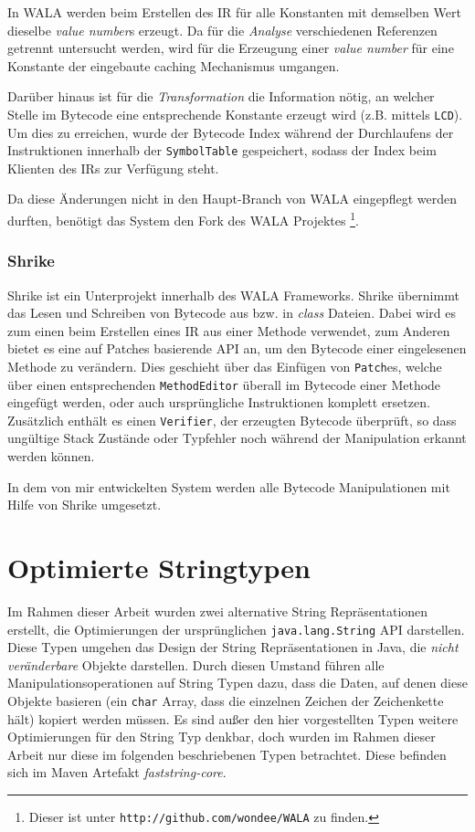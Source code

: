 In WALA werden beim Erstellen des IR für alle Konstanten mit demselben Wert dieselbe \textit{value number}s erzeugt. 
Da für die \textit{Analyse} verschiedenen Referenzen getrennt untersucht werden, wird 
für die Erzeugung einer \textit{value number} für eine Konstante der eingebaute caching Mechanismus umgangen. 

Darüber hinaus ist für die \textit{Transformation} die Information nötig, an welcher Stelle im Bytecode eine
entsprechende Konstante erzeugt wird (z.B. mittels \texttt{LCD}). Um dies zu erreichen, wurde der Bytecode 
Index während der Durchlaufens der Instruktionen innerhalb der \texttt{SymbolTable} gespeichert, 
sodass der Index beim Klienten des IRs zur Verfügung steht.

Da diese Änderungen nicht in den Haupt-Branch von WALA eingepflegt werden durften, benötigt das System den 
Fork des WALA Projektes \footnote{Dieser ist unter \texttt{http://github.com/wondee/WALA} zu finden.}.


\subsection{Shrike}

Shrike ist ein Unterprojekt innerhalb des WALA Frameworks. Shrike übernimmt das Lesen und  
Schreiben von Bytecode aus bzw. in \textit{class} Dateien. Dabei wird es zum einen beim 
Erstellen eines IR aus einer Methode verwendet, zum Anderen bietet es eine auf Patches 
basierende API an, um den Bytecode einer eingelesenen Methode zu verändern. Dies geschieht 
über das Einfügen von \texttt{Patch}es, welche über einen 
entsprechenden \texttt{MethodEditor} überall im Bytecode einer Methode eingefügt werden, oder auch 
ursprüngliche Instruktionen komplett ersetzen. Zusätzlich enthält es einen \texttt{Verifier}, der erzeugten 
Bytecode überprüft, so dass ungültige Stack Zustände oder Typfehler noch während der Manipulation erkannt 
werden können. 

In dem von mir entwickelten System werden alle Bytecode Manipulationen mit Hilfe von Shrike umgesetzt. 

\chapter{Optimierte Stringtypen}\label{stringLabels}

Im Rahmen dieser Arbeit wurden zwei alternative String Repräsentationen erstellt, 
die Optimierungen der ursprünglichen \texttt{java.lang.String} API darstellen. Diese 
Typen umgehen das Design der String Repräsentationen
in Java, die \textit{nicht veränderbare} Objekte darstellen. Durch diesen Umstand führen alle
Manipulationsoperationen auf String Typen dazu, dass die Daten, auf denen diese Objekte basieren
(ein \texttt{char} Array, dass die einzelnen Zeichen der Zeichenkette hält) kopiert werden müssen.
Es sind außer den hier vorgestellten Typen weitere Optimierungen für den String Typ denkbar, 
doch wurden im Rahmen dieser Arbeit nur diese im folgenden beschriebenen Typen betrachtet. 
Diese befinden sich im Maven Artefakt \textit{faststring-core}.

